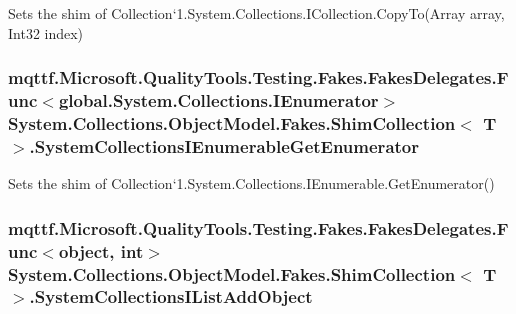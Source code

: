 Sets the shim of Collection`1.System.\-Collections.\-I\-Collection.\-Copy\-To(\-Array array, Int32 index)

\hypertarget{class_system_1_1_collections_1_1_object_model_1_1_fakes_1_1_shim_collection_3_01_t_01_4_ad682bf52272925b91fc6a2674caf3b9d}{
\subsubsection[{System\-Collections\-I\-Enumerable\-Get\-Enumerator}]{\setlength{\rightskip}{0pt plus 5cm}mqttf.\-Microsoft.\-Quality\-Tools.\-Testing.\-Fakes.\-Fakes\-Delegates.\-Func$<$global.\-System.\-Collections.\-I\-Enumerator$>$ System.\-Collections.\-Object\-Model.\-Fakes.\-Shim\-Collection$<$ T $>$.System\-Collections\-I\-Enumerable\-Get\-Enumerator\hspace{0.3cm}{\ttfamily [set]}}}\label{class_system_1_1_collections_1_1_object_model_1_1_fakes_1_1_shim_collection_3_01_t_01_4_ad682bf52272925b91fc6a2674caf3b9d}


Sets the shim of Collection`1.System.\-Collections.\-I\-Enumerable.\-Get\-Enumerator()

\hypertarget{class_system_1_1_collections_1_1_object_model_1_1_fakes_1_1_shim_collection_3_01_t_01_4_ae5099b55c277cee7bdfc14d3b158cc4e}{
\subsubsection[{System\-Collections\-I\-List\-Add\-Object}]{\setlength{\rightskip}{0pt plus 5cm}mqttf.\-Microsoft.\-Quality\-Tools.\-Testing.\-Fakes.\-Fakes\-Delegates.\-Func$<$object, int$>$ System.\-Collections.\-Object\-Model.\-Fakes.\-Shim\-Collection$<$ T $>$.System\-Collections\-I\-List\-Add\-Object\hspace{0.3cm}{\ttfamily [set]}}}\label{class_system_1_1_collections_1_1_object_model_1_1_fakes_1_1_shim_collection_3_01_t_01_4_ae5099b55c277cee7bdfc14d3b158cc4e}


